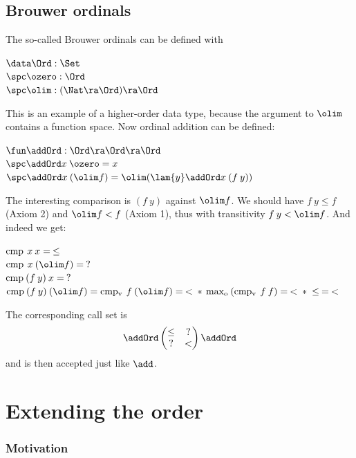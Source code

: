 \subsection{Brouwer ordinals}
The so-called Brouwer ordinals can be defined with
\begin{bsp}
$\data \Ord : \Set$ \\
$\spc \ozero : \Ord $\\
$\spc \olim : (\Nat \ra \Ord ) \ra \Ord $
\end{bsp}
This is an example of a higher-order data type, because the argument to $\olim$ contains a function space.
Now ordinal addition can be defined:
\begin{bsp}
$\fun \addOrd : \Ord \ra \Ord \ra \Ord$\\
$\spc \addOrd x \: \ozero = x $\\
$\spc \addOrd x \: (\olim f) = \olim ( \lam{y} \addOrd  x \: (f \: y))  $
\end{bsp}
The interesting comparison is $(f \: y)$ against $\olim f$.
We should have $f \: y \leq f$ (Axiom 2) and $\olim f < f $ (Axiom 1), thus with transitivity $ f\: y < \olim f$.
And indeed we get:
\begin{bsp}
$\operatorname{cmp} \: x \: x = \: \leq $\\
$\cmp \: x \: (\olim f) = \: ? $\\
$\operatorname{cmp} \: (f \: y) \: x = \: ? $\\
$\cmp \: (f \: y) \: (\olim f) = \cmpv \: f \: (\olim f) = \: < \: * \: \supo \: (\cmpv \: f \: f) = \: < \: * \: \leq \: = \: < $ 
\end{bsp}
The corresponding call set is
\[
\addOrd\begin{pmatrix}
\leq & ? \\
?    & < \\
\end{pmatrix}\addOrd
\]
and is then accepted just like $\add$.
\section{Extending the order}

\subsubsection{Motivation}

